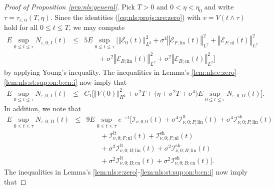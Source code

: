 \documentclass[10pt]{articleHJ}
\newcommand{\e}{\ensuremath{\varepsilon}}
\newcommand{\norm}[1]{\left\Vert#1\right\Vert}		%
\newcommand{\sref}[1]{(\ref{#1})}                       %
\numberwithin{equation}{section}
\begin{document}
\begin{proof}[Proof of Proposition \ref{prp:nls:general}]
Pick $T >0$ and $0 < \eta < \eta_0$
and write $\tau = \tau_{\e,\alpha}(T, \eta)$.
Since the identities \sref{eq:nls:projs:are:zero}
with $v = V(t\wedge\tau)$ hold for all $0 \le t \le T$,
we may compute
\begin{equation}
\begin{array}{lcl}
E \sup_{0 \le t \le \tau} N_{\e,0;I}(t)
& \le &
5 E
\sup_{0 \le t \le \tau}
\Big[
\norm{\mathcal{E}_0(t)}_{L^2}^2
+ \sigma^4 \norm{\mathcal{E}_{F;\mathrm{lin}}(t)}_{L^2}^2
+ \norm{\mathcal{E}_{F;\mathrm{nl}}(t)}_{L^2}^2
\\[0.2cm]
& & \qquad
+ \sigma^2 \norm{\mathcal{E}_{B;\mathrm{lin}}(t)}_{L^2}^2
+ \sigma^2 \norm{\mathcal{E}_{B;\mathrm{cn}}(t)}_{L^2}^2
\Big]
\end{array}
\end{equation}
by applying Young's inequality.
The inequalities in
Lemma's \ref{lem:nls:e:zero}-\ref{lem:nls:st:sup:on:b:cn:i}
now imply that
\begin{equation}
\begin{array}{lcl}
E \sup_{0 \le t \le \tau} N_{\e,0;I}(t)
& \le &
C_1 \big[ \norm{V(0)}_{H^1}^2
  + \sigma^2 T
  + \Big( \eta
  + \sigma^2 T + \sigma^4 \Big)
    E \sup_{0 \le t \le \tau}  N_{\e,0;II}(t)
\big].
\end{array}
\end{equation}
In addition,
we note that
\begin{equation}
\begin{array}{lcl}
E \sup_{0 \le t \le \tau} N_{\e,0;II}(t)
& \le &
9 E \sup_{0 \le t \le \tau}
e^{-\e t}
\Big[
  \mathcal{I}_{\nu,0;0}(t)
+ \sigma^4 \mathcal{I}^{\mathrm{lt}}_{\nu,0;F;\mathrm{lin}}(t)
+ \sigma^4 \mathcal{I}^{\mathrm{sh}}_{\nu,0;F;\mathrm{lin}}(t)
\\[0.2cm]
& & \qquad
+ \mathcal{I}^{\mathrm{lt}}_{\nu,0;F;\mathrm{nl}}(t)
+ \mathcal{I}^{\mathrm{sh}}_{\nu,0;F;\mathrm{nl}}(t)
\\[0.2cm]
& & \qquad
+ \sigma^2 \mathcal{I}^{\mathrm{lt}}_{\nu,0;B;\mathrm{lin}}(t)
+ \sigma^2 \mathcal{I}^{\mathrm{sh}}_{\nu,0;B;\mathrm{lin}}(t)
\\[0.2cm]
& & \qquad
+\sigma^2 \mathcal{I}^{\mathrm{lt}}_{\nu,0;B;\mathrm{cn}}(t)
+ \sigma^2 \mathcal{I}^{\mathrm{sh}}_{\nu,0;B;\mathrm{cn}}(t)
\Big] .
\end{array}
\end{equation}
The inequalities in
Lemma's \ref{lem:nls:e:zero}-\ref{lem:nls:st:sup:on:b:cn:i}
now imply that

\end{proof}
\end{document}
